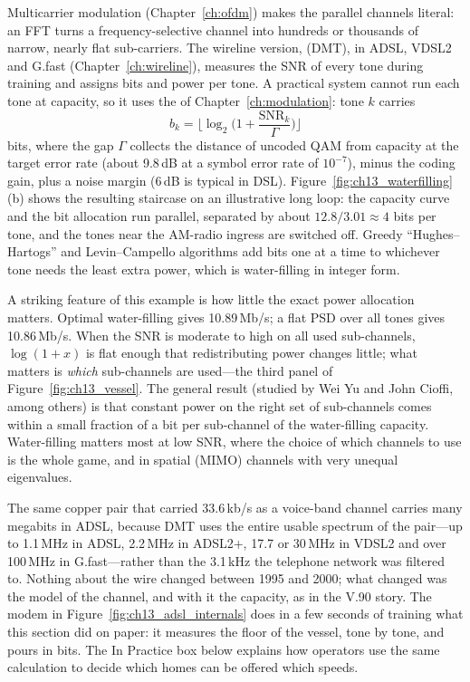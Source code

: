 Multicarrier modulation (Chapter~\ref{ch:ofdm}) makes the parallel channels literal: an FFT turns
a frequency-selective channel into hundreds or thousands of narrow, nearly flat sub-carriers. The
wireline version,  (DMT), in ADSL, VDSL2 and G.fast
(Chapter~\ref{ch:wireline}), measures the SNR of every tone during training and assigns bits and
power per tone. A practical system cannot run each tone at capacity, so it uses the  of Chapter~\ref{ch:modulation}: tone $k$ carries
\begin{equation}
b_k=\Big\lfloor\log_2\!\Big(1+\frac{\mathrm{SNR}_k}{\Gamma}\Big)\Big\rfloor
\label{eq:ch13:bitload}
\end{equation}
bits, where the gap $\Gamma$ collects the distance of uncoded QAM from capacity at the target error
rate (about 9.8\,dB at a symbol error rate of $10^{-7}$), minus the coding gain, plus a noise margin
(6\,dB is typical in DSL). Figure~\ref{fig:ch13_waterfilling}(b) shows the resulting staircase on an
illustrative long loop: the capacity curve and the bit allocation run parallel, separated by about
$12.8/3.01\approx4$ bits per tone, and the tones near the AM-radio ingress are
switched off. Greedy ``Hughes--Hartogs'' and Levin--Campello algorithms add bits one at a time to
whichever tone needs the least extra power, which is water-filling in integer form.

A striking feature of this example is how little the exact power allocation matters. Optimal
water-filling gives 10.89\,Mb/s; a flat PSD over all tones gives 10.86\,Mb/s. When the SNR is
moderate to high on all used sub-channels, $\log(1+x)$ is flat enough that redistributing power
changes little; what matters is \emph{which} sub-channels are used---the third panel of
Figure~\ref{fig:ch13_vessel}. The general result (studied by Wei Yu and John Cioffi, among others)
is that constant power on the right set of sub-channels comes within a small fraction of a bit per
sub-channel of the water-filling capacity. Water-filling matters most at low SNR, where the choice
of which channels to use is the whole game, and in spatial (MIMO) channels with very unequal
eigenvalues.


The same copper pair that carried 33.6\,kb/s as a voice-band channel carries many megabits in
ADSL, because DMT uses the entire usable spectrum of the pair---up to 1.1\,MHz in ADSL, 2.2\,MHz in
ADSL2+, 17.7 or 30\,MHz in VDSL2 and over 100\,MHz in G.fast---rather than the 3.1\,kHz the
telephone network was filtered to. Nothing about the wire changed between 1995 and 2000; what
changed was the model of the channel, and with it the capacity, as in the V.90 story. The modem
in Figure~\ref{fig:ch13_adsl_internals} does in a few seconds of training what this section did
on paper: it measures the floor of the vessel, tone by tone, and pours in bits. The In Practice
box below explains how operators use the same calculation to decide which homes can be offered
which speeds.

